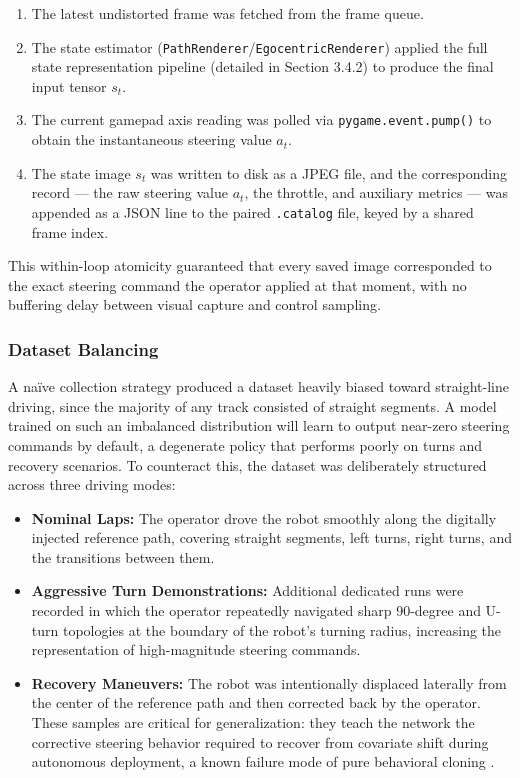 \begin{enumerate}
    \item The latest undistorted frame was fetched from the frame queue.
    \item The state estimator (\texttt{PathRenderer}/\texttt{EgocentricRenderer}) applied the full state representation pipeline
          (detailed in Section 3.4.2) to produce the final input tensor $s_t$.
    \item The current gamepad axis reading was polled via \texttt{pygame.event.pump()} to
          obtain the instantaneous steering value $a_t$.
    \item The state image $s_t$ was written to disk as a JPEG file, and the corresponding
          record --- the raw steering value $a_t$, the throttle, and auxiliary metrics ---
          was appended as a JSON line to the paired \texttt{.catalog} file, keyed by a
          shared frame index.
\end{enumerate}

This within-loop atomicity guaranteed that every saved image corresponded to the exact
steering command the operator applied at that moment, with no buffering delay between
visual capture and control sampling.

\subsubsection{Dataset Balancing}

A naïve collection strategy produced a dataset heavily biased toward straight-line driving,
since the majority of any track consisted of straight segments. A model trained on such an
imbalanced distribution will learn to output near-zero steering commands by default, a
degenerate policy that performs poorly on turns and recovery scenarios. To counteract this,
the dataset was deliberately structured across three driving modes:

\begin{itemize}
    \item \textbf{Nominal Laps:} The operator drove the robot smoothly along the digitally
          injected reference path, covering straight segments, left turns, right turns, and the
          transitions between them.
    \item \textbf{Aggressive Turn Demonstrations:} Additional dedicated runs were recorded in
          which the operator repeatedly navigated sharp 90-degree and U-turn topologies at
          the boundary of the robot's turning radius, increasing the representation of
          high-magnitude steering commands.
    \item \textbf{Recovery Maneuvers:} The robot was intentionally displaced laterally from
          the center of the reference path and then corrected back by the operator. These
          samples are critical for generalization: they teach the network the corrective
          steering behavior required to recover from covariate shift during autonomous
          deployment, a known failure mode of pure behavioral cloning
          \cite{Codevilla2019BehaviorCloningLimits}.
\end{itemize}

